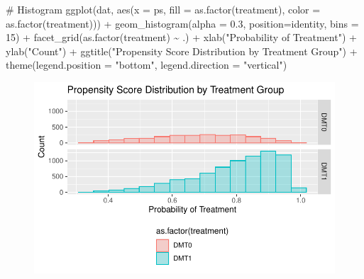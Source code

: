 \documentclass[
  letterpaper,
  DIV=11,
  numbers=noendperiod]{scrreprt}
\newenvironment{Shaded}{\begin{snugshade}}{\end{snugshade}}
\newcommand{\AttributeTok}[1]{\textcolor[rgb]{0.40,0.45,0.13}{#1}}
\newcommand{\CommentTok}[1]{\textcolor[rgb]{0.37,0.37,0.37}{#1}}
\newcommand{\DecValTok}[1]{\textcolor[rgb]{0.68,0.00,0.00}{#1}}
\newcommand{\FloatTok}[1]{\textcolor[rgb]{0.68,0.00,0.00}{#1}}
\newcommand{\FunctionTok}[1]{\textcolor[rgb]{0.28,0.35,0.67}{#1}}
\newcommand{\NormalTok}[1]{\textcolor[rgb]{0.00,0.23,0.31}{#1}}
\newcommand{\SpecialCharTok}[1]{\textcolor[rgb]{0.37,0.37,0.37}{#1}}
\newcommand{\StringTok}[1]{\textcolor[rgb]{0.13,0.47,0.30}{#1}}
\begin{document}
\begin{Shaded}
\begin{Highlighting}[]
\CommentTok{\# Histogram}
\FunctionTok{ggplot}\NormalTok{(dat, }\FunctionTok{aes}\NormalTok{(}\AttributeTok{x =}\NormalTok{ ps, }\AttributeTok{fill =} \FunctionTok{as.factor}\NormalTok{(treatment), }\AttributeTok{color =} \FunctionTok{as.factor}\NormalTok{(treatment))) }\SpecialCharTok{+} 
  \FunctionTok{geom\_histogram}\NormalTok{(}\AttributeTok{alpha =} \FloatTok{0.3}\NormalTok{, }\AttributeTok{position=}\StringTok{\textquotesingle{}identity\textquotesingle{}}\NormalTok{, }\AttributeTok{bins =} \DecValTok{15}\NormalTok{) }\SpecialCharTok{+} 
  \FunctionTok{facet\_grid}\NormalTok{(}\FunctionTok{as.factor}\NormalTok{(treatment) }\SpecialCharTok{\textasciitilde{}}\NormalTok{ .) }\SpecialCharTok{+} 
  \FunctionTok{xlab}\NormalTok{(}\StringTok{"Probability of Treatment"}\NormalTok{) }\SpecialCharTok{+} 
  \FunctionTok{ylab}\NormalTok{(}\StringTok{"Count"}\NormalTok{) }\SpecialCharTok{+}
  \FunctionTok{ggtitle}\NormalTok{(}\StringTok{"Propensity Score Distribution by Treatment Group"}\NormalTok{) }\SpecialCharTok{+}
  \FunctionTok{theme}\NormalTok{(}\AttributeTok{legend.position =} \StringTok{"bottom"}\NormalTok{, }\AttributeTok{legend.direction =} \StringTok{"vertical"}\NormalTok{)}
\end{Highlighting}
\end{Shaded}

\begin{figure}[H]

{\centering \includegraphics{chapter_06_files/figure-pdf/unnamed-chunk-8-1.pdf}

}

\end{figure}
\end{document}
